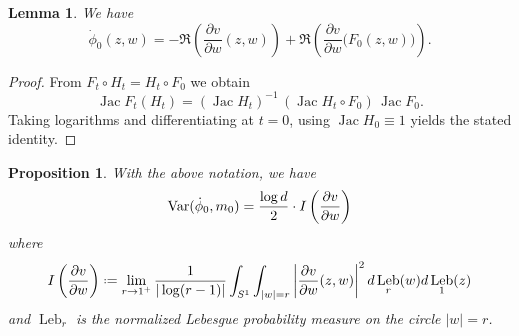 \documentclass[11pt]{amsart}
\theoremstyle{plain}
\newtheorem{prop}[thm]{Proposition}
\newtheorem{lem}[thm]{Lemma}
\theoremstyle{definition}
\theoremstyle{remark}
\newcommand*{\defeq}{\mathrel{\vcenter{\baselineskip0.5ex \lineskiplimit0pt
			\hbox{\scriptsize.}\hbox{\scriptsize.}}}%
	=}
\DeclareMathOperator{\Jac}{Jac}
\DeclareMathOperator{\Leb}{Leb}
\begin{document}
\begin{lem}\label{lem_coboundary_identity}
We have
\[
\dot\phi_0(z,w)
=
-\Re\!\left(\frac{\partial v}{\partial w}(z,w)\right)
+
\Re\!\left(\frac{\partial v}{\partial w}\bigl(F_0(z,w)\bigr)\right).
\]
\end{lem}

\begin{proof}
From $F_t\circ H_t=H_t\circ F_0$ we obtain
\[
\Jac F_t(H_t)= (\Jac H_t)^{-1}\,(\Jac H_t\circ F_0)\,\Jac F_0.
\]
Taking logarithms and differentiating at $t=0$, using $\Jac H_0\equiv1$ 
yields the stated identity.
\end{proof}



\begin{prop} \label{thm_main_2}
With the above notation,
 we have
\[{\rm Var}(\dot\phi_0,m_0) = 
\frac{\log d}{2}
 \cdot I
\left(
\frac{\partial v}{\partial w}\right)
\]
where
\[
I
\left(
\frac{\partial v}{\partial w}\right) \defeq
\lim_{r \to 1^+} \frac{1}{|\log(r-1)|}
 \int_{S^1}
\int_{|w|=r}\left|\frac{\partial v}{\partial w}(z,w)\right|^2
d\Leb_r (w)
d\Leb_1(z)
\]
and $\Leb_r$ is the normalized Lebesgue
probability
 measure on the circle $|w|=r$.
\end{prop}
\end{document}
